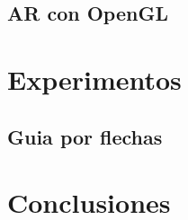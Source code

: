 \documentclass[a4paper, 12pt]{book}
\begin{document}
\section{AR con OpenGL}
\label{sec:arconopengl}

\chapter{Experimentos}
\label{sec:experimentos}

\section{Guia por flechas}
\label{subsec:guiaporflechas}

\chapter{Conclusiones}
\label{sec:conclusiones}

\cleardoublepage

%
%  
\end{document}
